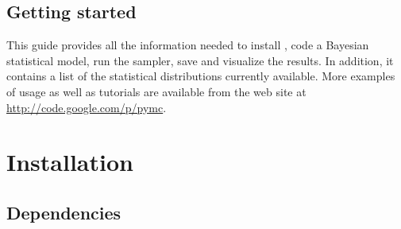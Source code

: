\documentclass[]{jss}
\begin{document}

\subsection{Getting started}
  \label{getting-started}%


This guide provides all the information needed to install , code
a Bayesian statistical model, run the sampler, save and visualize the results.
In addition, it contains a list of the statistical distributions currently available. More examples of usage as well as
tutorials are available from the  web site at \href{http://code.google.com/p/pymc}{http://code.google.com/p/pymc}.




\section[Installation]{Installation}
\label{chap:install}


\subsection{Dependencies}
  \label{dependencies}%
\end{document}

